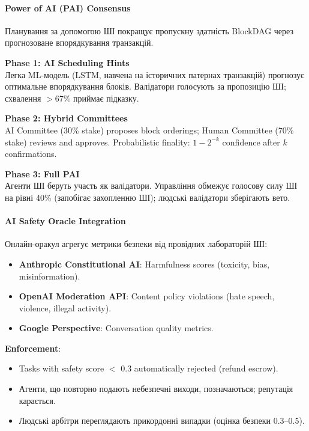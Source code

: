 \documentclass[11pt]{article}
\begin{document}
\paragraph{Power of AI (PAI) Consensus}
Планування за допомогою ШІ покращує пропускну здатність BlockDAG через прогнозоване впорядкування транзакцій.

\textbf{Phase 1: AI Scheduling Hints}\\
Легка ML-модель (LSTM, навчена на історичних патернах транзакцій) прогнозує оптимальне впорядкування блоків. Валідатори голосують за пропозицію ШІ; схвалення $>$67\% приймає підказку.

\textbf{Phase 2: Hybrid Committees}\\
AI Committee (30\% stake) proposes block orderings; Human Committee (70\% stake) reviews and approves. Probabilistic finality: $1 - 2^{-k}$ confidence after $k$ confirmations.

\textbf{Phase 3: Full PAI}\\
Агенти ШІ беруть участь як валідатори. Управління обмежує голосову силу ШІ на рівні 40\% (запобігає захопленню ШІ); людські валідатори зберігають вето.

\paragraph{AI Safety Oracle Integration}
Онлайн-оракул агрегує метрики безпеки від провідних лабораторій ШІ:
\begin{itemize}[noitemsep]
  \item \textbf{Anthropic Constitutional AI}: Harmfulness scores (toxicity, bias, misinformation).
  \item \textbf{OpenAI Moderation API}: Content policy violations (hate speech, violence, illegal activity).
  \item \textbf{Google Perspective}: Conversation quality metrics.
\end{itemize}

\textbf{Enforcement}:
\begin{itemize}[noitemsep]
  \item Tasks with safety score $<$ 0.3 automatically rejected (refund escrow).
  \item Агенти, що повторно подають небезпечні виходи, позначаються; репутація карається.
  \item Людські арбітри переглядають прикордонні випадки (оцінка безпеки 0.3--0.5).
\end{itemize}
\end{document}

